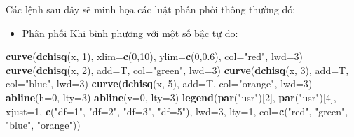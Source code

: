 \documentclass[
]{book}
\newenvironment{Shaded}{\begin{snugshade}}{\end{snugshade}}
\newcommand{\DataTypeTok}[1]{\textcolor[rgb]{0.13,0.29,0.53}{#1}}
\newcommand{\DecValTok}[1]{\textcolor[rgb]{0.00,0.00,0.81}{#1}}
\newcommand{\FloatTok}[1]{\textcolor[rgb]{0.00,0.00,0.81}{#1}}
\newcommand{\KeywordTok}[1]{\textcolor[rgb]{0.13,0.29,0.53}{\textbf{#1}}}
\newcommand{\NormalTok}[1]{#1}
\newcommand{\StringTok}[1]{\textcolor[rgb]{0.31,0.60,0.02}{#1}}
\providecommand{\tightlist}{%
  \setlength{\itemsep}{0pt}\setlength{\parskip}{0pt}}
\begin{document}
Các lệnh sau đây sẽ minh họa các luật phân phối thông thường đó:

\begin{itemize}
\tightlist
\item
  Phân phối Khi bình phương với một số bậc tự do:
\end{itemize}

\begin{Shaded}
\begin{Highlighting}[]
\KeywordTok{curve}\NormalTok{(}\KeywordTok{dchisq}\NormalTok{(x, }\DecValTok{1}\NormalTok{), }\DataTypeTok{xlim=}\KeywordTok{c}\NormalTok{(}\DecValTok{0}\NormalTok{,}\DecValTok{10}\NormalTok{), }\DataTypeTok{ylim=}\KeywordTok{c}\NormalTok{(}\DecValTok{0}\NormalTok{,}\FloatTok{0.6}\NormalTok{), }\DataTypeTok{col=}\StringTok{"red"}\NormalTok{, }\DataTypeTok{lwd=}\DecValTok{3}\NormalTok{)}
\KeywordTok{curve}\NormalTok{(}\KeywordTok{dchisq}\NormalTok{(x, }\DecValTok{2}\NormalTok{), }\DataTypeTok{add=}\NormalTok{T, }\DataTypeTok{col=}\StringTok{"green"}\NormalTok{, }\DataTypeTok{lwd=}\DecValTok{3}\NormalTok{)}
\KeywordTok{curve}\NormalTok{(}\KeywordTok{dchisq}\NormalTok{(x, }\DecValTok{3}\NormalTok{), }\DataTypeTok{add=}\NormalTok{T, }\DataTypeTok{col=}\StringTok{"blue"}\NormalTok{, }\DataTypeTok{lwd=}\DecValTok{3}\NormalTok{)}
\KeywordTok{curve}\NormalTok{(}\KeywordTok{dchisq}\NormalTok{(x, }\DecValTok{5}\NormalTok{), }\DataTypeTok{add=}\NormalTok{T, }\DataTypeTok{col=}\StringTok{"orange"}\NormalTok{, }\DataTypeTok{lwd=}\DecValTok{3}\NormalTok{)}
\KeywordTok{abline}\NormalTok{(}\DataTypeTok{h=}\DecValTok{0}\NormalTok{, }\DataTypeTok{lty=}\DecValTok{3}\NormalTok{)}
\KeywordTok{abline}\NormalTok{(}\DataTypeTok{v=}\DecValTok{0}\NormalTok{, }\DataTypeTok{lty=}\DecValTok{3}\NormalTok{)}
\KeywordTok{legend}\NormalTok{(}\KeywordTok{par}\NormalTok{(}\StringTok{"usr"}\NormalTok{)[}\DecValTok{2}\NormalTok{], }\KeywordTok{par}\NormalTok{(}\StringTok{"usr"}\NormalTok{)[}\DecValTok{4}\NormalTok{], }
         \DataTypeTok{xjust=}\DecValTok{1}\NormalTok{, }
         \KeywordTok{c}\NormalTok{(}\StringTok{"df=1"}\NormalTok{, }\StringTok{"df=2"}\NormalTok{, }\StringTok{"df=3"}\NormalTok{, }\StringTok{"df=5"}\NormalTok{), }\DataTypeTok{lwd=}\DecValTok{3}\NormalTok{, }\DataTypeTok{lty=}\DecValTok{1}\NormalTok{, }
         \DataTypeTok{col=}\KeywordTok{c}\NormalTok{(}\StringTok{"red"}\NormalTok{, }\StringTok{"green"}\NormalTok{, }\StringTok{"blue"}\NormalTok{, }\StringTok{"orange"}\NormalTok{)) }
\end{Highlighting}
\end{Shaded}
\end{document}
